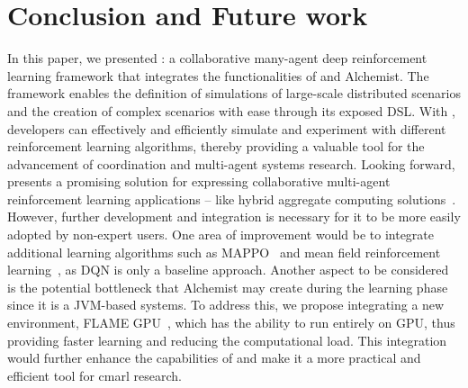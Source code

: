 \section{Conclusion and Future work}\label{coordination2023:conclusion}
In this paper, we presented \scarlib{}: 
 a collaborative many-agent deep reinforcement learning framework that integrates the functionalities of \scafi{} and Alchemist.
%
 The framework enables the definition of simulations of large-scale distributed scenarios 
 and the creation of complex scenarios with ease through its exposed DSL. 
% 
With \scarlib{}, developers can effectively and efficiently simulate and experiment with different reinforcement learning algorithms, 
 thereby providing a valuable tool for the advancement of coordination and multi-agent systems research.
Looking forward, \scarlib{} presents a promising solution 
 for expressing collaborative multi-agent reinforcement learning applications -- like hybrid aggregate computing solutions~\cite{Aguzzi2021,Aguzzi2022,Aguzzi2022-Roadmap,DBLP:conf/acsos/AguzziCV22}.
 However, further development and integration is necessary for it to be more easily adopted by non-expert users. 
 One area of improvement would be to integrate additional learning algorithms such as MAPPO~\cite{mappo} and mean field reinforcement learning~\cite{meanfield}, 
 as DQN is only a baseline approach.
%
Another aspect to be considered is the potential bottleneck that Alchemist may create during the learning phase since it is a JVM-based systems. 
%
To address this, we propose integrating a new environment, FLAME GPU~\cite{flame}, 
which has the ability to run entirely on GPU, 
thus providing faster learning and reducing the computational load. 
%
This integration would further enhance the capabilities of \scarlib{} and make it a more practical and efficient tool for \ac{cmarl} research.



%
%
%
\printbibliography